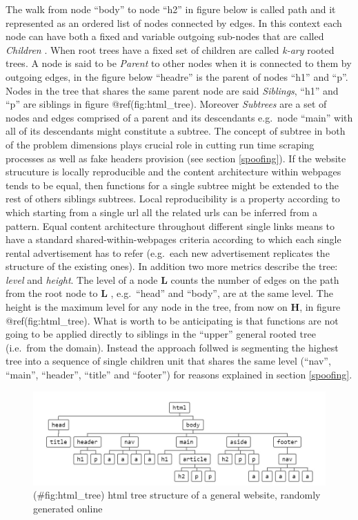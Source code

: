 \documentclass[
  12pt,
  a4paper,
  oneside]{book}
\theoremstyle{definition}
\theoremstyle{definition}
\theoremstyle{definition}
\theoremstyle{remark}
\begin{document}
The walk from node ``body'' to node ``h2'' in figure below is called path and it represented as an ordered list of nodes connected by edges. In this context each node can have both a fixed and variable outgoing sub-nodes that are called \emph{Children} . When root trees have a fixed set of children are called \emph{k-ary} rooted trees. A node is said to be \emph{Parent} to other nodes when it is connected to them by outgoing edges, in the figure below ``headre'' is the parent of nodes ``h1'' and ``p''. Nodes in the tree that shares the same parent node are said \emph{Siblings}, ``h1'' and ``p'' are siblings in figure @ref(fig:html\_tree). Moreover \emph{Subtrees} are a set of nodes and edges comprised of a parent and its descendants e.g.~node ``main'' with all of its descendants might constitute a subtree. The concept of subtree in both of the problem dimensions plays crucial role in cutting run time scraping processes as well as fake headers provision (see section \ref{spoofing}). If the website strucuture is locally reproducible and the content architecture within webpages tends to be equal, then functions for a single subtree might be extended to the rest of others siblings subtrees. Local reproducibility is a property according to which starting from a single url all the related urls can be inferred from a pattern. Equal content architecture throughout different single links means to have a standard shared-within-webpages criteria according to which each single rental advertisement has to refer (e.g.~each new advertisement replicates the structure of the existing ones). In addition two more metrics describe the tree: \emph{level} and \emph{height}. The level of a node \(\mathbf{L}\) counts the number of edges on the path from the root node to \(\mathbf{L}\) , e.g.~``head'' and ``body'', are at the same level. The height is the maximum level for any node in the tree, from now on \(\mathbf{H}\), in figure @ref(fig:html\_tree). What is worth to be anticipating is that functions are not going to be applied directly to siblings in the ``upper'' general rooted tree (i.e.~from the domain). Instead the approach follwed is segmenting the highest tree into a sequence of single children unit that shares the same level (``nav'', ``main'', ``header'', ``title'' and ``footer'') for reasons explained in section \ref{spoofing}.

\begin{figure}
\centering
\includegraphics{images/html_general_representation.jpg}
\caption{(\#fig:html\_tree) html tree structure of a general website, randomly generated online}
\end{figure}
\end{document}
